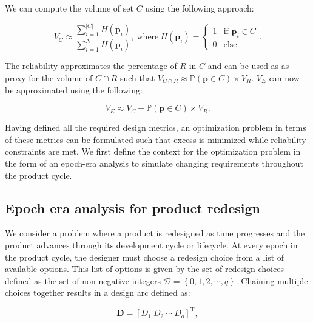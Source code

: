 We can compute the volume of set $C$ using the following approach:

\begin{equation} \label{eq:Cmontecarlo}
	V_C \approx \dfrac{\sum\limits_{i=1}^{|{C}|} H\left(\mathbf{p}_i\right)}{\sum\limits_{i=1}^{N} H\left(\mathbf{p}_i\right)}, ~\mathrm{where}~ H\left(\mathbf{p}_i\right)={\begin{cases}1&{\text{if }}\mathbf{p}_i\in C\\0&{\text{else}}\end{cases}}.
\end{equation}

The reliability approximates the percentage of $R$ in $C$ and can be used as as proxy for the volume of $C\cap R$ such that $V_{C\cap R} \approx \mathbb{P}(\mathbf{p} \in C) \times V_R$. $V_E$ can now be approximated using the following:

\begin{equation} \label{eq:excesssimple}
	V_E \approx V_C - \mathbb{P}(\mathbf{p} \in C) \times V_R.
\end{equation}

Having defined all the required design metrics, an optimization problem in terms of these metrics can be formulated such that excess is minimized while reliability constraints are met. We first define the context for the optimization problem in the form of an epoch-era analysis to simulate changing requirements throughout the product cycle.

\subsection{Epoch era analysis for product redesign} \label{subsec:epochera}

We consider a problem where a product is redesigned as time progresses and the product advances through its development cycle or lifecycle. At every epoch in the product cycle, the designer must choose a redesign choice from a list of available options. This list of options is given by the set of redesign choices defined as the set of non-negative integers $\mathcal{D} = \left\{0,1,2,\cdots,q\right\}$. Chaining multiple choices together results in a design arc defined as:

\begin{equation} \label{eq:designarc}
	\mathbf{D} = \left[D_1 ~ D_2 ~ \cdots ~ D_o\right]^{\mathrm{T}},
\end{equation}

